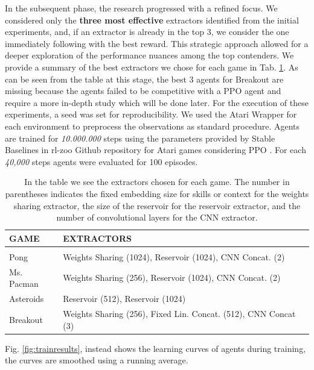 In the subsequent phase, the research progressed with a refined focus. We considered only the \textbf{three most effective} extractors identified from the initial experiments, and, if an extractor is already in the top 3, we consider the one immediately following with the best reward.
This strategic approach allowed for a deeper exploration of the performance nuances among the top contenders.
We provide a summary of the best extractors we chose for each game in Tab. \ref{tab:top3}.
As can be seen from the table at this stage, the best 3 agents for Breakout are missing because the agents failed to be competitive with a PPO agent and require a more in-depth study which will be done later.
For the execution of these experiments, a seed was set for reproducibility. We used the Atari Wrapper for each environment to preprocess the observations as standard procedure. Agents are trained for \textit{10.000.000} steps using the parameters provided by Stable Baselines in rl-zoo Github repository for Atari games considering PPO \cite{rl-zoo3}.
For each \textit{40,000} steps agents were evaluated for 100 episodes.

\begin{table}[htbp]
    \begin{center}
        \begin{tabular}{ll}
            \multicolumn{1}{l}{\bf GAME}  &\multicolumn{1}{l}{\bf EXTRACTORS}
            \\ \hline \\
            Pong       & Weights Sharing (1024), Reservoir (1024), CNN Concat. (2) \\
            Ms. Pacman & Weights Sharing (256), Reservoir (1024), CNN Concat. (2) \\
            Asteroids         & Reservoir (512), Reservoir (1024) \\
            Breakout          & Weights Sharing (256), Fixed Lin. Concat. (512), CNN Concat (3) \\
        \end{tabular}
    \end{center}
    \caption{In the table we see the extractors chosen for each game. The number in parentheses indicates the fixed embedding size for skills or context for the weights sharing extractor, the size of the reservoir for the reservoir extractor, and the number of convolutional layers for the CNN extractor.}
    \label{tab:top3}
\end{table}

Fig. \ref{fig:trainresults}, instead shows the learning curves of agents during training, the curves are smoothed using a running average.

